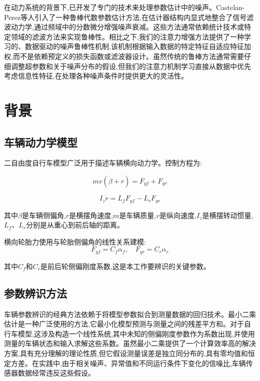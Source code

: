 \documentclass[Afour,sageh,times]{sagej}
\begin{document}
在动力系统的背景下,已开发了专门的技术来处理参数估计中的噪声。Castelan-Perez等人\citep{CastelanPerez2025FilteringAF}引入了一种鲁棒代数参数估计方法,在估计器结构内显式地整合了信号滤波动力学,通过频域中的分数微分增强噪声衰减。这些方法通常依赖统计技术或特定领域的滤波方法来实现鲁棒性。相比之下,我们的注意力增强方法提供了一种学习的、数据驱动的噪声鲁棒性机制,该机制根据输入数据的特定特征自适应特征加权,而不是依赖预定义的损失函数或滤波器设计。虽然传统的鲁棒方法通常需要仔细调整超参数和关于噪声分布的假设,但我们的注意力机制学习直接从数据中优先考虑信息性特征,在处理各种噪声条件时提供更大的灵活性。

\section{背景}
\label{sec:background}

\subsection{车辆动力学模型}
\label{sec:vehicle_model}

二自由度自行车模型广泛用于描述车辆横向动力学\citep{rajamani2012vehicle}。控制方程为:

\begin{equation}
m v (\dot{\beta} + r) = F_{yf} + F_{yr}
\end{equation}

\begin{equation}
I_z \dot{r} = L_f F_{yf} - L_r F_{yr}
\end{equation}

其中$\beta$是车辆侧偏角,$r$是横摆角速度,$m$是车辆质量,$v$是纵向速度,$I_z$是横摆转动惯量,$L_f$、$L_r$分别是从重心到前后轴的距离。

横向轮胎力使用与轮胎侧偏角的线性关系建模:
\begin{equation}
F_{yf} = C_f \alpha_f, \quad F_{yr} = C_r \alpha_r
\end{equation}

其中$C_f$和$C_r$是前后轮侧偏刚度系数,这是本工作要辨识的关键参数。

\subsection{参数辨识方法}
\label{sec:param_id_methods}

车辆参数辨识的经典方法依赖于将模型参数拟合到测量数据的回归技术。最小二乘估计是一种广泛使用的方法,它最小化模型预测与测量之间的残差平方和\citep{rajamani2012vehicle}。对于自行车模型,这涉及构造一个线性系统,其中未知的侧偏刚度参数作为系数出现,并使用测量的车辆状态和输入求解这些系数。虽然最小二乘提供了一个计算效率高的解决方案,具有充分理解的理论性质,但它假设测量误差是独立同分布的,具有零均值和恒定方差。在实践中,由于相关噪声、异常值和不同运行条件下变化的信噪比,车辆传感器数据经常违反这些假设。
\end{document}
